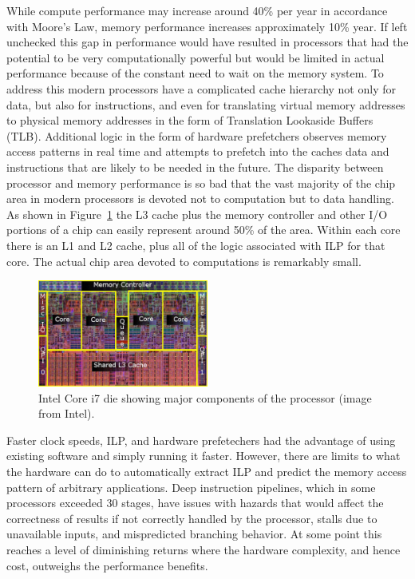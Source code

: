 \documentclass{JINST}
\begin{document}
While compute performance may increase around 40\% per year in accordance with Moore's Law, memory performance increases approximately 10\% year.  If left unchecked this gap in performance would have resulted in processors that had the potential to be very computationally powerful but would be limited in actual performance because of the constant need to wait on the memory system.  To address this modern processors have a complicated cache hierarchy not only for data, but also for instructions, and even for translating virtual memory addresses to physical memory addresses in the form of Translation Lookaside Buffers (TLB).  Additional logic in the form of hardware prefetchers observes memory access patterns in real time and attempts to prefetch into the caches data and instructions that are likely to be needed in the future.  The disparity between processor and memory performance is so bad that the vast majority of the chip area in modern processors is devoted not to computation but to data handling.  As shown in Figure~\ref{fig:core_i7_die} the L3 cache plus the memory controller and other I/O portions of a chip can easily represent around 50\% of the area.  Within each core there is an L1 and L2 cache, plus all of the logic associated with ILP for that core.  The actual chip area devoted to computations is remarkably small.

\begin{figure}[!Hhtb]
\begin{center}
\includegraphics[width=0.5\textwidth]{figs/Core_i7_die.pdf}
\caption{Intel Core i7 die showing major components of the processor (image from Intel). \label{fig:core_i7_die}}
\end{center}
\end{figure}

Faster clock speeds, ILP, and hardware prefetechers had the advantage of using existing software and simply running it faster.  However, there are limits to what the hardware can do to automatically extract ILP and predict the memory access pattern of arbitrary applications.  Deep instruction pipelines, which in some processors exceeded 30 stages, have issues with hazards that would affect the correctness of results if not correctly handled by the processor, stalls due to unavailable inputs, and mispredicted branching behavior.  At some point this reaches a level of diminishing returns where the hardware complexity, and hence cost, outweighs the performance benefits.
\end{document}
